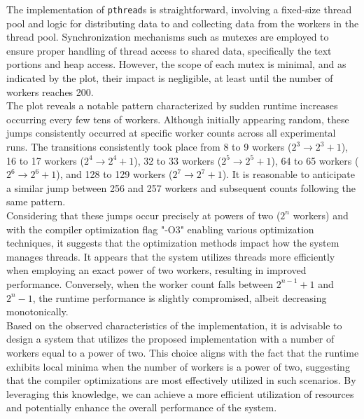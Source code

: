 \documentclass[10pt]{article}
\begin{document}
The implementation of \texttt{pthread}s is straightforward, involving a fixed-size thread pool and logic for distributing data to and collecting data from the workers in the thread pool. Synchronization mechanisms such as mutexes are employed to ensure proper handling of thread access to shared data, specifically the text portions and heap access. However, the scope of each mutex is minimal, and as indicated by the plot, their impact is negligible, at least until the number of workers reaches 200.\\
The plot reveals a notable pattern characterized by sudden runtime increases occurring every few tens of workers. Although initially appearing random, these jumps consistently occurred at specific worker counts across all experimental runs. The transitions consistently took place from 8 to 9 workers ($2^3 \rightarrow 2^3 + 1$), 16 to 17 workers ($2^4 \rightarrow 2^4 + 1$), 32 to 33 workers ($2^5 \rightarrow 2^5 + 1$), 64 to 65 workers ($2^6 \rightarrow 2^6 + 1$), and 128 to 129 workers ($2^7 \rightarrow 2^7 + 1$). It is reasonable to anticipate a similar jump between 256 and 257 workers and subsequent counts following the same pattern.\\
Considering that these jumps occur precisely at powers of two ($2^n$ workers) and with the compiler optimization flag "-O3" enabling various optimization techniques, it suggests that the optimization methods impact how the system manages threads. It appears that the system utilizes threads more efficiently when employing an exact power of two workers, resulting in improved performance. Conversely, when the worker count falls between $2^{n-1} + 1$ and $2^n - 1$, the runtime performance is slightly compromised, albeit decreasing monotonically.\\
Based on the observed characteristics of the implementation, it is advisable to design a system that utilizes the proposed implementation with a number of workers equal to a power of two. This choice aligns with the fact that the runtime exhibits local minima when the number of workers is a power of two, suggesting that the compiler optimizations are most effectively utilized in such scenarios. By leveraging this knowledge, we can achieve a more efficient utilization of resources and potentially enhance the overall performance of the system.
\end{document}

